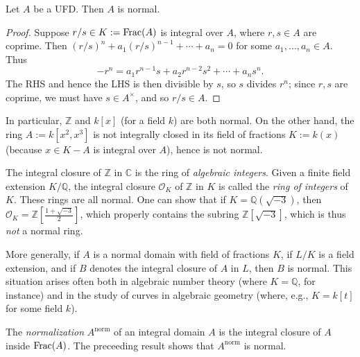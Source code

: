 \documentclass[10pt]{article}
\begin{document}
\begin{lemma}
Let $A$ be a UFD.  Then $A$ is normal.
\end{lemma}
\begin{proof}
  Suppose $r/s \in K := \operatorname{Frac}(A)$ is integral over $A$,
  where $r,s \in A$ are coprime.
  Then $(r/s)^n + a_1 (r/s)^{n-1} + \dotsb + a_n = 0$ for some
  $a_1,\dotsc,a_n \in A$.
  Thus
  \[
  -r^n = a_1 r^{n-1} s + a_2 r^{n-2} s^2 + \dotsb + a_n s^n.
  \]
  The RHS and hence the LHS is then divisible by $s$,
  so $s$ divides $r^n$;
  since $r,s$ are coprime, we must have $s \in A^\times$,
  and so $r/s \in A$.
\end{proof}

\begin{example}
  In particular, $\mathbb{Z}$ and $k[x]$ (for a field $k$)
  are both normal.
  On the other hand, the ring $A := k[x^2,x^3]$ is not integrally
  closed in its field of fractions $K := k(x)$ (because $x \in K - A$ is integral over $A$),
  hence is not normal.

  The integral closure of $\mathbb{Z}$ in $\mathbb{C}$ is the
  ring of \emph{algebraic integers}.  Given a finite field
  extension $K/\mathbb{Q}$, the integral closure $\mathcal{O}_K$
  of $\mathbb{Z}$ in $K$ is called the \emph{ring of integers}
  of $K$.  These rings are all normal.
  One can show that if
  $K = \mathbb{Q}(\sqrt{-3})$,
  then $\mathcal{O}_K = \mathbb{Z} [\frac{1 + \sqrt{-3}}{2}]$,
  which properly contains the subring
  $\mathbb{Z}[\sqrt{-3}]$,
  which is thus \emph{not} a normal ring.

  More generally, if $A$ is a normal domain with field of
  fractions $K$, if $L/K$ is a field extension, and if $B$
  denotes the integral closure of $A$ in $L$, then $B$ is
  normal.
  This situation arises often both in algebraic number theory
  (where $K = \mathbb{Q}$, for instance)
  and in the study of curves in algebraic geometry (where,
  e.g., $K = k[t]$ for some field $k$).

\end{example}

The \emph{normalization} \(A^{\mathrm{norm}}\) of an integral domain \(A\)
is the integral closure of \(A\) inside \(\operatorname{Frac}(A)\).
The preceeding result shows that \(A^{\mathrm{norm}}\) is normal.
\end{document}
